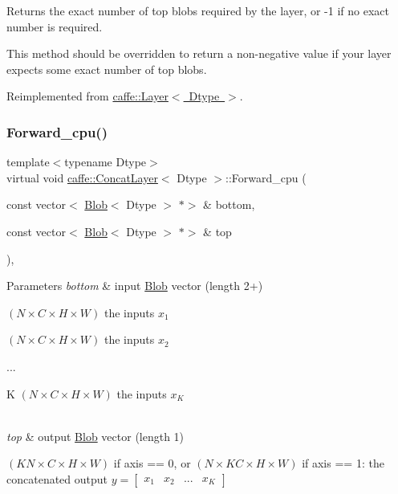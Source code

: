 Returns the exact number of top blobs required by the layer, or -\/1 if no exact number is required. 

This method should be overridden to return a non-\/negative value if your layer expects some exact number of top blobs. 

Reimplemented from \mbox{\hyperlink{classcaffe_1_1_layer_a64e2ca72c719e4b2f1f9216ccfb0d37f}{caffe\+::\+Layer$<$ Dtype $>$}}.

\mbox{\label{classcaffe_1_1_concat_layer_ab2e03afe654f6b4240086e30ff4efdd8}} 
\subsubsection{\texorpdfstring{Forward\+\_\+cpu()}{Forward\_cpu()}\hspace{0.1cm}{\footnotesize\ttfamily [1/2]}}
{\footnotesize\ttfamily template$<$typename Dtype$>$ \\
virtual void \mbox{\hyperlink{classcaffe_1_1_concat_layer}{caffe\+::\+Concat\+Layer}}$<$ Dtype $>$\+::Forward\+\_\+cpu (\begin{DoxyParamCaption}\item[{const vector$<$ \mbox{\hyperlink{classcaffe_1_1_blob}{Blob}}$<$ Dtype $>$ $\ast$$>$ \&}]{bottom,  }\item[{const vector$<$ \mbox{\hyperlink{classcaffe_1_1_blob}{Blob}}$<$ Dtype $>$ $\ast$$>$ \&}]{top }\end{DoxyParamCaption})\hspace{0.3cm}{\ttfamily [protected]}, {\ttfamily [virtual]}}


\begin{DoxyParams}{Parameters}
{\em bottom} & input \mbox{\hyperlink{classcaffe_1_1_blob}{Blob}} vector (length 2+)
\begin{DoxyEnumerate}
\item $ (N \times C \times H \times W) $ the inputs $ x_1 $
\item $ (N \times C \times H \times W) $ the inputs $ x_2 $
\item ...
\end{DoxyEnumerate}
\begin{DoxyItemize}
\item K $ (N \times C \times H \times W) $ the inputs $ x_K $ 
\end{DoxyItemize}\\
\hline
{\em top} & output \mbox{\hyperlink{classcaffe_1_1_blob}{Blob}} vector (length 1)
\begin{DoxyEnumerate}
\item $ (KN \times C \times H \times W) $ if axis == 0, or $ (N \times KC \times H \times W) $ if axis == 1\+: the concatenated output $ y = [\begin{array}{cccc} x_1 & x_2 & ... & x_K \end{array}] $ 
\end{DoxyEnumerate}\\
\hline
\end{DoxyParams}



